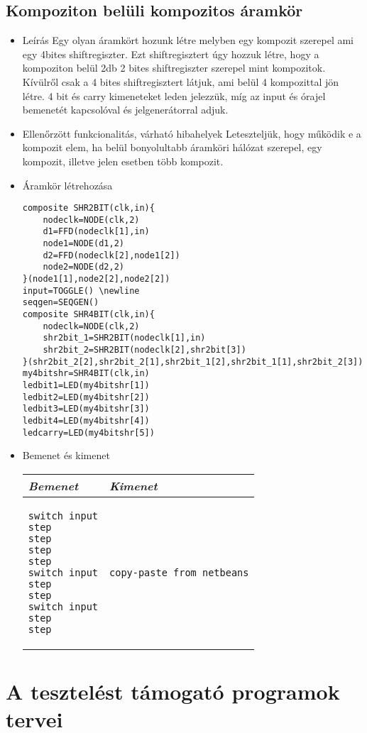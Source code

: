 \subsection{Kompoziton belüli kompozitos áramkör}
\begin{itemize}
\item Leírás\newline
Egy olyan áramkört hozunk létre melyben egy kompozit szerepel ami egy 4bites shiftregiszter. Ezt shiftregisztert úgy hozzuk létre, hogy a kompoziton belül 2db 2 bites shiftregiszter szerepel mint kompozitok. Kívülről csak a 4 bites shiftregisztert látjuk, ami belül 4 kompozittal jön létre. 4 bit és carry kimeneteket leden jelezzük, míg az input és órajel bemenetét kapcsolóval és jelgenerátorral adjuk.
\item Ellenőrzött funkcionalitás, várható hibahelyek\newline
Leteszteljük, hogy működik e a kompozit elem, ha belül bonyolultabb áramköri hálózat szerepel, egy kompozit, illetve jelen esetben több kompozit.

\item Áramkör létrehozása

\begin{verbatim}
composite SHR2BIT(clk,in){		
    nodeclk=NODE(clk,2)		
    d1=FFD(nodeclk[1],in)		
    node1=NODE(d1,2)			
    d2=FFD(nodeclk[2],node1[2])
    node2=NODE(d2,2)			
}(node1[1],node2[2],node2[2])
input=TOGGLE() \newline
seqgen=SEQGEN()
composite SHR4BIT(clk,in){		
    nodeclk=NODE(clk,2)		
    shr2bit_1=SHR2BIT(nodeclk[1],in)
    shr2bit_2=SHR2BIT(nodeclk[2],shr2bit[3])			
}(shr2bit_2[2],shr2bit_2[1],shr2bit_1[2],shr2bit_1[1],shr2bit_2[3])
my4bitshr=SHR4BIT(clk,in)
ledbit1=LED(my4bitshr[1])
ledbit2=LED(my4bitshr[2])
ledbit3=LED(my4bitshr[3])
ledbit4=LED(my4bitshr[4])
ledcarry=LED(my4bitshr[5])
\end{verbatim}

\item Bemenet és kimenet\newline

\begin{tabular}{|p{5cm}|p{5cm}|} 
\hline 
\textit{Bemenet} & \textit{Kimenet} \\ \hline
\begin{verbatim}
switch input
step
step
step
step
switch input
step
step
switch input
step
step
\end{verbatim}
& 
\begin{verbatim}
copy-paste from netbeans
\end{verbatim}
\\ \hline
\end{tabular}

\end{itemize}


\section{A tesztelést támogató programok tervei}

